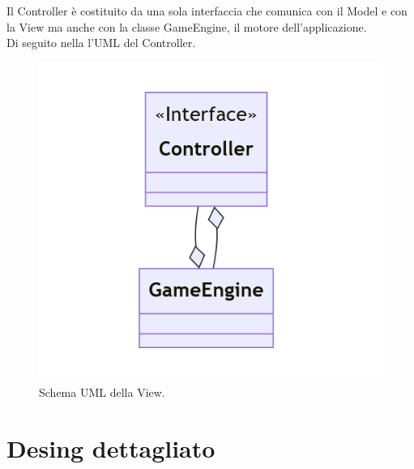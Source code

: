 \documentclass[a4paper,12pt]{report}
\begin{document}
Il Controller è costituito da una sola interfaccia che comunica con il Model e con la View ma anche con la classe GameEngine, il motore dell'applicazione.
\\Di seguito nella  l'UML del Controller.
\begin{figure}[H]
    \centering{}
    \includegraphics[scale=0.4]{images/Controller.png}
    \caption{Schema UML della View.}
    \label{images:Controller}
\end{figure}
\newpage
\section{Desing dettagliato}
\end{document}
